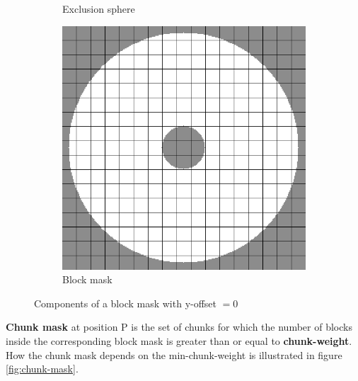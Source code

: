 \documentclass[12pt]{article}
\begin{document}
\begin{figure}[H]
\begin{subfigure}{0.333\textwidth}
\caption{Exclusion sphere}
\label{fig:exclusion-sphere}
\end{subfigure}%
\begin{subfigure}{0.333\textwidth}
\includegraphics[width=.9\linewidth]{block-mask.png}
\caption{Block mask}
\label{fig:block-mask}
\end{subfigure}
\caption{Components of a block mask with y-offset $= 0$}
\label{fig:block-mask-components}
\end{figure}

{\bfseries Chunk mask} at position P is the set of chunks for which the number of blocks inside the corresponding block mask is greater than or equal to {\bfseries chunk-weight}. How the chunk mask depends on the min-chunk-weight is illustrated in figure \ref{fig:chunk-mask}.
\end{document}
